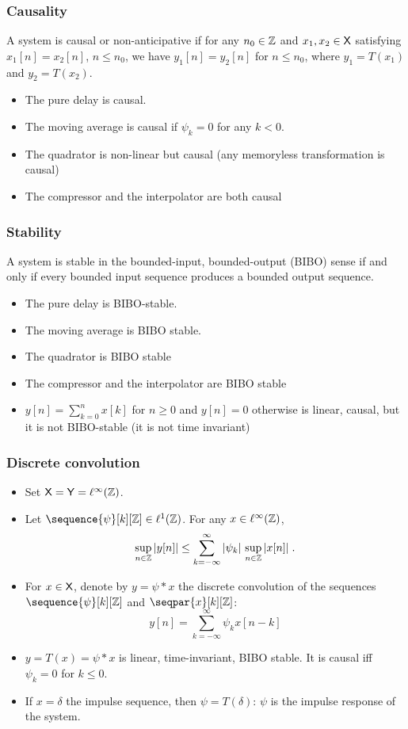 \begin{frame}
\frametitle{Causality}
\begin{definition}
A system is \alert{causal} or \alert{non-anticipative} if for any $n_0 \in \mathbb{Z}$ and $x_1, x_2 \in \mathsf{X}$ satisfying $x_1[n]= x_2[n]$, $n \leq n_0$, we have $y_1[n]= y_2[n]$ for $n \leq n_0$, where $y_1= T(x_1)$ and $y_2= T(x_2)$.
\end{definition}
\begin{itemize}
\item The pure delay is causal.
\item The moving average is causal if $\psi_k=0$ for any $k < 0$.
\item The quadrator is non-linear but causal (any memoryless transformation is causal)
\item The compressor and the interpolator are both causal
\end{itemize}
\end{frame}

\begin{frame}
\frametitle{Stability}
\begin{definition}
A system is stable in the bounded-input, bounded-output (BIBO) sense if and only if every bounded input sequence produces a bounded output sequence.
\end{definition}
\begin{itemize}
\item The pure delay is BIBO-stable.
\item The moving average is BIBO stable.
\item The quadrator is BIBO stable
\item The compressor and the interpolator are BIBO stable
\item $y[n]= \sum_{k=0}^n x[k]$ for $n \geq 0$ and $y[n]=0$ otherwise is linear, causal, but it is not BIBO-stable (it is not time invariant)
\end{itemize}

\end{frame}

\begin{frame}
\frametitle{Discrete convolution}
\begin{itemize}
\item Set $\mathsf{X}= \mathsf{Y}= \ell^\infty(\mathbb{Z})$.
\item Let $\sequence{\psi}[k][\zset] \in \plone$. For any $x \in \ell^\infty(\mathbb{Z})$,
\[
\sup_{n \in \mathbb{Z}} |y[n]| \leq \sum_{k=-\infty}^\infty |\psi_k| \, \sup_{n \in \mathbb{Z}} |x[n]| \;.
\]
\item For $x \in \mathsf{X}$, denote by $y = \psi * x$ the \alert{discrete convolution} of the sequences $\sequence{\psi}[k][\zset]$ and $\seqpar{x}[k][\zset]$:
\[
y[n]= \sum_{k=-\infty}^{\infty} \psi_k x[n-k]
\]
\item $y= T(x)= \psi * x$ is linear, time-invariant, BIBO stable. It is causal iff $\psi_k= 0$ for $k \leq 0$.
\item If $x= \delta$ the \alert{impulse sequence}, then $\psi= T(\delta)$: $\psi$ is the \alert{impulse response} of the system.
\end{itemize}
\end{frame}


